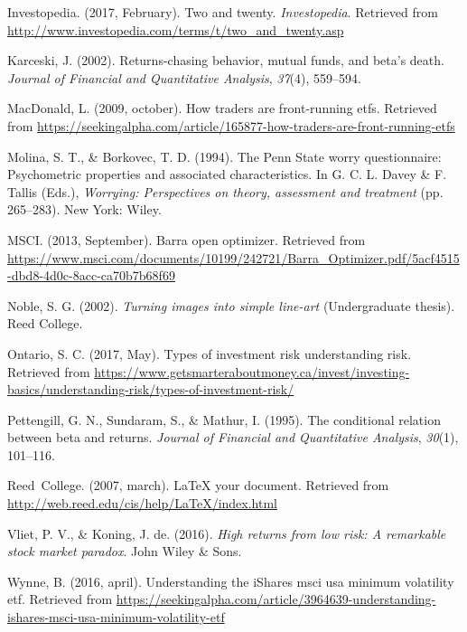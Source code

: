 \documentclass[12pt,twoside]{reedthesis}
\theoremstyle{definition}
\theoremstyle{definition}
\theoremstyle{definition}
\theoremstyle{remark}
\begin{document}
\hypertarget{ref-investopedia2017}{}
Investopedia. (2017, February). Two and twenty. \emph{Investopedia}.
Retrieved from
\url{http://www.investopedia.com/terms/t/two_and_twenty.asp}

\hypertarget{ref-karceski2002}{}
Karceski, J. (2002). Returns-chasing behavior, mutual funds, and beta's
death. \emph{Journal of Financial and Quantitative Analysis},
\emph{37}(4), 559--594.

\hypertarget{ref-macdonald2009}{}
MacDonald, L. (2009, october). How traders are front-running etfs.
Retrieved from
\url{https://seekingalpha.com/article/165877-how-traders-are-front-running-etfs}

\hypertarget{ref-Molina1994}{}
Molina, S. T., \& Borkovec, T. D. (1994). The Penn State worry
questionnaire: Psychometric properties and associated characteristics.
In G. C. L. Davey \& F. Tallis (Eds.), \emph{Worrying: Perspectives on
theory, assessment and treatment} (pp. 265--283). New York: Wiley.

\hypertarget{ref-msci2013}{}
MSCI. (2013, September). Barra open optimizer. Retrieved from
\url{https://www.msci.com/documents/10199/242721/Barra_Optimizer.pdf/5acf4515-dbd8-4d0c-8acc-ca70b7b68f69}

\hypertarget{ref-noble2002}{}
Noble, S. G. (2002). \emph{Turning images into simple line-art}
(Undergraduate thesis). Reed College.

\hypertarget{ref-ontario2017}{}
Ontario, S. C. (2017, May). Types of investment risk \textbar{}
understanding risk. Retrieved from
\url{https://www.getsmarteraboutmoney.ca/invest/investing-basics/understanding-risk/types-of-investment-risk/}

\hypertarget{ref-pettengill1995}{}
Pettengill, G. N., Sundaram, S., \& Mathur, I. (1995). The conditional
relation between beta and returns. \emph{Journal of Financial and
Quantitative Analysis}, \emph{30}(1), 101--116.

\hypertarget{ref-reedweb2007}{}
Reed~College. (2007, march). LaTeX your document. Retrieved from
\url{http://web.reed.edu/cis/help/LaTeX/index.html}

\hypertarget{ref-van2016}{}
Vliet, P. V., \& Koning, J. de. (2016). \emph{High returns from low
risk: A remarkable stock market paradox}. John Wiley \& Sons.

\hypertarget{ref-wynne2016}{}
Wynne, B. (2016, april). Understanding the iShares msci usa minimum
volatility etf. Retrieved from
\url{https://seekingalpha.com/article/3964639-understanding-ishares-msci-usa-minimum-volatility-etf}


\end{document}
